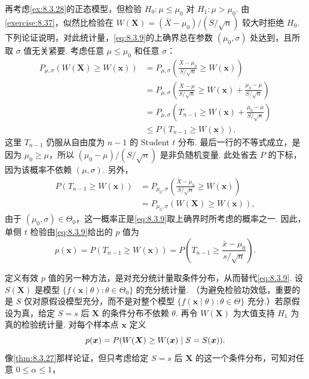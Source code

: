 \begin{example}[单侧正态检验的 $p$ 值]\label{ex:8.3.29}
再考虑\autoref{ex:8.3.28}的正态模型，但检验 $H_0:\mu\le\mu_0$ 对 $H_1:\mu>\mu_0$. 由\autoref{exercise:8.37}，似然比检验在 $W(\boldsymbol X)=(\bar X-\mu_0)/(S/\sqrt n)$ 较大时拒绝 $H_0$. 下列论证说明，对此统计量，\eqref{eq:8.3.9}的上确界总在参数 $(\mu_0,\sigma)$ 处达到，且所取 $\sigma$ 值无关紧要. 考虑任意 $\mu\le\mu_0$ 和任意 $\sigma$：
$$\begin{aligned}
P_{\mu,\sigma}(W(\boldsymbol X)\ge W(\boldsymbol x))
&=P_{\mu,\sigma}\left(\frac{\bar X-\mu_0}{S/\sqrt n}\ge W(\boldsymbol x)\right)\\
&=P_{\mu,\sigma}\left(\frac{\bar X-\mu}{S/\sqrt n}\ge W(\boldsymbol x)+\frac{\mu_0-\mu}{S/\sqrt n}\right)\\
&=P_{\mu,\sigma}\left(T_{n-1}\ge W(\boldsymbol x)+\frac{\mu_0-\mu}{S/\sqrt n}\right)\\
&\le P(T_{n-1}\ge W(\boldsymbol x)).
\end{aligned}$$
这里 $T_{n-1}$ 仍服从自由度为 $n-1$ 的 Student $t$ 分布. 最后一行的不等式成立，是因为 $\mu_0\ge\mu$，所以 $(\mu_0-\mu)/(S/\sqrt n)$ 是非负随机变量. 此处省去 $P$ 的下标，因为该概率不依赖 $(\mu,\sigma)$. 另外，
$$\begin{aligned}
P(T_{n-1}\ge W(\boldsymbol x))&=P_{\mu_0,\sigma}\left(\frac{\bar X-\mu_0}{S/\sqrt n}\ge W(\boldsymbol x)\right)\\
&=P_{\mu_0,\sigma}(W(\boldsymbol X)\ge W(\boldsymbol x)),
\end{aligned}$$
由于 $(\mu_0,\sigma)\in\Theta_0$，这一概率正是\eqref{eq:8.3.9}取上确界时所考虑的概率之一. 因此，单侧 $t$ 检验由\eqref{eq:8.3.9}给出的 $p$ 值为
$$p(\boldsymbol x)=P(T_{n-1}\ge W(\boldsymbol x))=P\left(T_{n-1}\ge\frac{\bar x-\mu_0}{s/\sqrt n}\right).$$
\end{example}
定义有效 $p$ 值的另一种方法，是对充分统计量取条件分布，从而替代\eqref{eq:8.3.9}. 设 $S(\boldsymbol X)$ 是模型 $\{f(\boldsymbol x\mid\theta):\theta\in\Theta_0\}$ 的充分统计量. （为避免检验功效低，重要的是 $S$ 仅对原假设模型充分，而不是对整个模型 $\{f(\boldsymbol x\mid\theta):\theta\in\Theta\}$ 充分.）若原假设为真，给定 $S=s$ 后 $\boldsymbol X$ 的条件分布不依赖 $\theta$. 再令 $W(\boldsymbol X)$ 为大值支持 $H_1$ 为真的检验统计量. 对每个样本点 $\boldsymbol x$ 定义
\begin{equation}\label{eq:8.3.10}\index{SI0743@条件}p(\boldsymbol x)=P(W(\boldsymbol X)\ge W(\boldsymbol x)\mid S=S(\boldsymbol x)).\end{equation}
像\autoref{thm:8.3.27}那样论证，但只考虑给定 $S=s$ 后 $\boldsymbol X$ 的这一个条件分布，可知对任意 $0\le\alpha\le1$，
